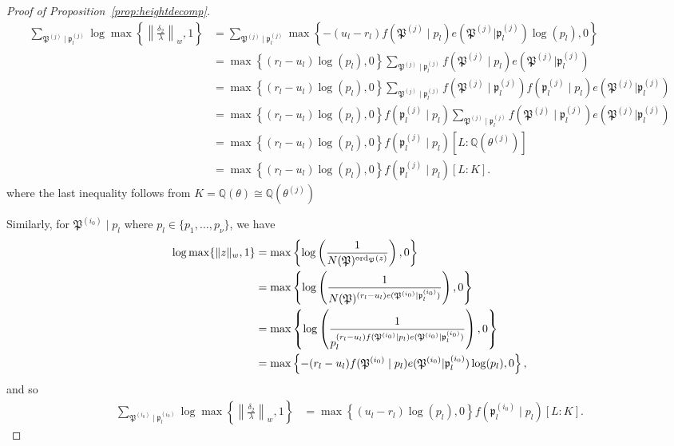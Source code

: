 \begin{proof}[Proof of Proposition~\ref{prop:heightdecomp}]
\begin{align*}
\sum_{\mathfrak{P}^{(j)} \mid \mathfrak{p}_l^{(j)}} \log \max \left\{ \left\|\frac{\delta_2}{\lambda}\right\|_{w}, 1\right\}
	& = \sum_{\mathfrak{P}^{(j)} \mid \mathfrak{p}_l^{(j)}} \max \left\{ -(u_l - r_l)f(\mathfrak{P}^{(j)}\mid p_l)e(\mathfrak{P}^{(j)}|\mathfrak{p}_l^{(j)})\log(p_l), 0\right\}\\
	& = \max \left\{ (r_l - u_l)\log(p_l), 0\right\}\sum_{\mathfrak{P}^{(j)} \mid \mathfrak{p}_l^{(j)}}f(\mathfrak{P}^{(j)}\mid p_l)e(\mathfrak{P}^{(j)}|\mathfrak{p}_l^{(j)})\\
	& = \max \left\{ (r_l - u_l)\log(p_l), 0\right\}\sum_{\mathfrak{P}^{(j)} \mid \mathfrak{p}_l^{(j)}}f(\mathfrak{P}^{(j)}\mid \mathfrak{p}_l^{(j)})f(\mathfrak{p}_l^{(j)}\mid p_l)e(\mathfrak{P}^{(j)}|\mathfrak{p}_l^{(j)})\\
	& = \max \left\{ (r_l - u_l)\log(p_l), 0\right\}f(\mathfrak{p}_l^{(j)}\mid p_l)\sum_{\mathfrak{P}^{(j)} \mid \mathfrak{p}_l^{(j)}}f(\mathfrak{P}^{(j)}\mid \mathfrak{p}_l^{(j)})e(\mathfrak{P}^{(j)}|\mathfrak{p}_l^{(j)})\\
	& = \max \left\{ (r_l - u_l)\log(p_l), 0\right\}f(\mathfrak{p}_l^{(j)}\mid p_l)[L:\mathbb{Q}(\theta^{(j)})]\\
	& = \max \left\{ (r_l - u_l)\log(p_l), 0\right\}f(\mathfrak{p}_l^{(j)}\mid p_l)[L:K].
\end{align*}
where the last inequality follows from $K = \mathbb{Q}(\theta) \cong \mathbb{Q}(\theta^{(j)})$

Similarly, for $\mathfrak{P}^{(i_0)}\mid p_l$ where $p_l \in \{p_1, \dots, p_{\nu}\}$, we have
\begin{align*}
 \log \max \{ \|z\|_{w}, 1\}	
 	& = \max \left\{ \log\left(\frac{1}{N(\mathfrak{P})^{\operatorname{ord}_{\mathfrak{P}}(z)}} \right), 0\right\}\\
	& = \max \left\{ \log\left(\frac{1}{N(\mathfrak{P})^{(r_l - u_l)e(\mathfrak{P}^{(i_0)}|\mathfrak{p}_l^{(i_0)})}} \right), 0\right\}\\
	& = \max \left\{ \log\left(\frac{1}{p_l^{(r_l - u_l)f(\mathfrak{P}^{(i_0)}\mid p_l)e(\mathfrak{P}^{(i_0)}|\mathfrak{p}_l^{(i_0)})}} \right), 0\right\}\\
	& = \max \left\{ -(r_l - u_l)f(\mathfrak{P}^{(i_0)}\mid p_l)e(\mathfrak{P}^{(i_0)}|\mathfrak{p}_l^{(i_0)})\log(p_l), 0\right\},
\end{align*}
and so
\begin{align*}
\sum_{\mathfrak{P}^{(i_0)} \mid \mathfrak{p}_l^{(i_0)}} \log \max \left\{ \left\|\frac{\delta_2}{\lambda}\right\|_{w}, 1\right\}
	& = \max \left\{ (u_l - r_l)\log(p_l), 0\right\}f(\mathfrak{p}_l^{(i_0)}\mid p_l)[L:K].
\end{align*}


\end{proof}
